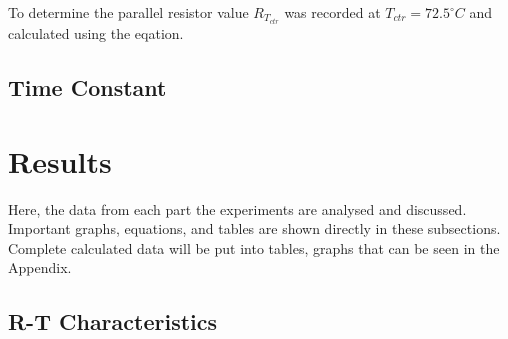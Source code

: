 \documentclass[a4,11pt]{article}
\begin{document}
To determine the parallel resistor value $R_{T_{ctr}}$ was recorded at $T_{ctr}=72.5^{\circ}C$ and calculated using the eqation.
\subsection{Time Constant}
\section{Results}
Here, the data from each part the experiments are analysed and discussed. Important graphs, equations, and tables are shown directly in these subsections. Complete calculated data will be put into tables, graphs that can be seen in the Appendix.
\subsection{R-T Characteristics}
\end{document}
